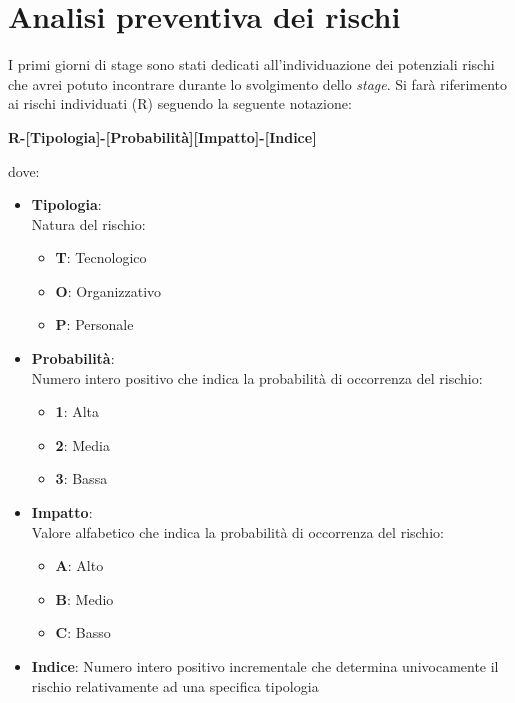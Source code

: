 \section{Analisi preventiva dei rischi}
I primi giorni di stage sono stati dedicati all'individuazione dei potenziali rischi che avrei potuto incontrare durante lo svolgimento dello \textit{stage}.
Si farà riferimento ai rischi individuati (R) seguendo la seguente notazione: 
\begin{center}
    \textbf{R-[Tipologia]-[Probabilità][Impatto]-[Indice]}
\end{center}
dove:
\begin{itemize}
    \item \textbf{Tipologia}: \\ Natura del rischio: \begin{itemize}
        \item \textbf{T}: Tecnologico
        \item \textbf{O}: Organizzativo
        \item \textbf{P}: Personale
    \end{itemize}
    \item \textbf{Probabilità}: \\ Numero intero positivo che indica la probabilità di occorrenza del rischio: \begin{itemize}
        \item \textbf{1}: Alta
        \item \textbf{2}: Media
        \item \textbf{3}: Bassa
    \end{itemize}
    \item \textbf{Impatto}: \\ Valore alfabetico che indica la probabilità di occorrenza del rischio: \begin{itemize}
        \item \textbf{A}: Alto
        \item \textbf{B}: Medio
        \item \textbf{C}: Basso
    \end{itemize}
    \item \textbf{Indice}: Numero intero positivo incrementale che determina univocamente il rischio relativamente ad una specifica tipologia
\end{itemize}

